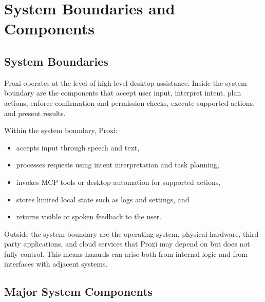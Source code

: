 \documentclass[12pt]{article}
\begin{document}
\section{System Boundaries and Components}

\subsection{System Boundaries}

Proxi operates at the level of high-level desktop assistance. Inside the
system boundary are the components that accept user input, interpret intent,
plan actions, enforce confirmation and permission checks, execute supported
actions, and present results.

Within the system boundary, Proxi:
\begin{itemize}[noitemsep]
  \item accepts input through speech and text,
  \item processes requests using intent interpretation and task planning,
  \item invokes MCP tools or desktop automation for supported actions,
  \item stores limited local state such as logs and settings, and
  \item returns visible or spoken feedback to the user.
\end{itemize}

Outside the system boundary are the operating system, physical hardware,
third-party applications, and cloud services that Proxi may depend on but
does not fully control. This means hazards can arise both from internal
logic and from interfaces with adjacent systems.

\subsection{Major System Components}
\end{document}
